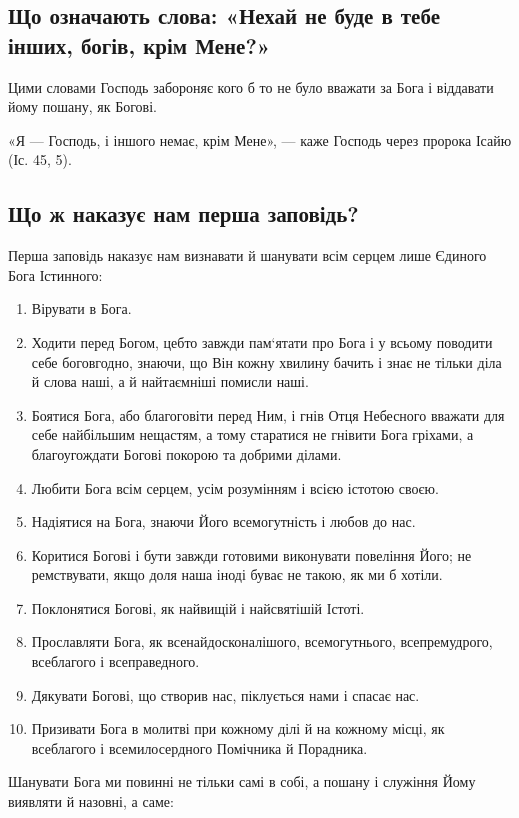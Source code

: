 \documentclass[main.tex]{subfiles}
\begin{document}
\subsection{Що означають слова: «Нехай не буде в тебе інших, богів, крім Мене?»}

Цими словами Господь забороняє кого б то не було вважати за Бога і віддавати йому пошану, як Богові.

«Я — Господь, і іншого немає, крім Мене», — каже Господь через пророка Ісайю (Іс. 45, 5).

\subsection{Що ж наказує нам перша заповідь?}

Перша заповідь наказує нам визнавати й шанувати всім серцем лише Єдиного Бога Істинного:
\begin{enumerate}
    \item Вірувати в Бога.
    \item Ходити перед Богом, цебто завжди пам`ятати про Бога і у всьому поводити себе боговгодно, знаючи, що Він кожну хвилину бачить і знає не тільки діла й слова наші, а й найтаємніші помисли наші.
    \item Боятися Бога, або благоговіти перед Ним, і гнів Отця Небесного вважати для себе найбільшим нещастям, а тому старатися не гнівити Бога гріхами, а благоугождати Богові покорою та добрими ділами.
    \item Любити Бога всім серцем, усім розумінням і всією істотою своєю.
    \item Надіятися на Бога, знаючи Його всемогутність і любов до нас.
    \item Коритися Богові і бути завжди готовими виконувати повеління Його; не ремствувати, якщо доля наша іноді буває не такою, як ми б хотіли.
    \item Поклонятися Богові, як найвищій і найсвятішій Істоті.
    \item Прославляти Бога, як всенайдосконалішого, всемогутнього, всепремудрого, всеблагого і всеправедного.
    \item Дякувати Богові, що створив нас, піклується нами і спасає нас.
    \item Призивати Бога в молитві при кожному ділі й на кожному місці, як всеблагого і всемилосердного Помічника й Порадника.
\end{enumerate}

Шанувати Бога ми повинні не тільки самі в собі, а пошану і служіння Йому виявляти й назовні, а саме:
\end{document}
